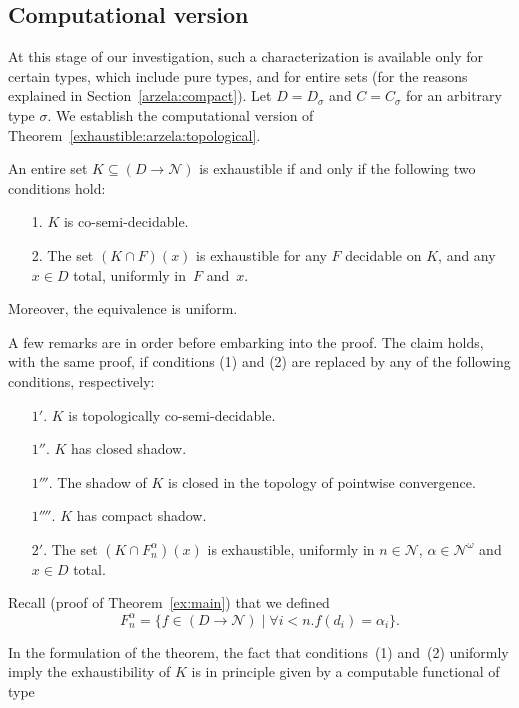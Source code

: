 \documentclass{LMCS}
\newcommand{\myomega}{\omega}
\newcommand{\pN}{\mathcal{N}}
\begin{document}
\subsection{Computational version}
\label{arzela}



At this stage of our investigation, such a characterization is
available only for certain types, which include pure types, and for
entire sets (for the reasons explained in
Section~\ref{arzela:compact}). Let $D=D_{\sigma}$ and $C = C_{\sigma}$
for an arbitrary type $\sigma$.  We establish the computational
version of Theorem~\ref{exhaustible:arzela:topological}.
\pagebreak[3]
\begin{thm} \label{exhaustible:arzela}
  An entire set $K \subseteq (D \to \pN)$ is exhaustible if and only if 
  the following two conditions hold:
  \begin{enumerate}
  \item[1.] $K$ is co-semi-decidable.
  \item[2.] The set $(K \cap F)(x)$ is exhaustible for any $F$
    decidable on $K$, and any $x \in D$ total, uniformly in~$F$
    and~$x$.
  \end{enumerate}
  Moreover, the equivalence is uniform. 
\end{thm}

\medskip

A few remarks are in order before embarking into the proof.
The claim holds, with the same proof, if
conditions (1) and (2) are replaced by any of the following
conditions, respectively:
\begin{enumerate}
\item[$1'$.] $K$ is topologically co-semi-decidable.
\item[$1''$.] $K$ has closed shadow.
\item[$1'''$.] The shadow of $K$ is closed in the topology of
  pointwise convergence.
\item[$1''''$.] $K$ has compact shadow.
\item[$2'$.]  The set $(K \cap F_n^\alpha)(x)$ is exhaustible, uniformly
    in $n \in \pN$, $\alpha \in \pN^\myomega$ and $x \in D$ total.
\end{enumerate}
Recall (proof of Theorem~\ref{ex:main}) that
we defined
\[
F_n^\alpha = \{ f \in (D \to \pN) \mid \forall i<n. f(d_i) = \alpha_i
\}. 
\]

In the formulation of the theorem, the fact that
conditions~(1) and~(2) uniformly imply the exhaustibility of $K$ is in
principle given by a computable functional of type
\end{document}
